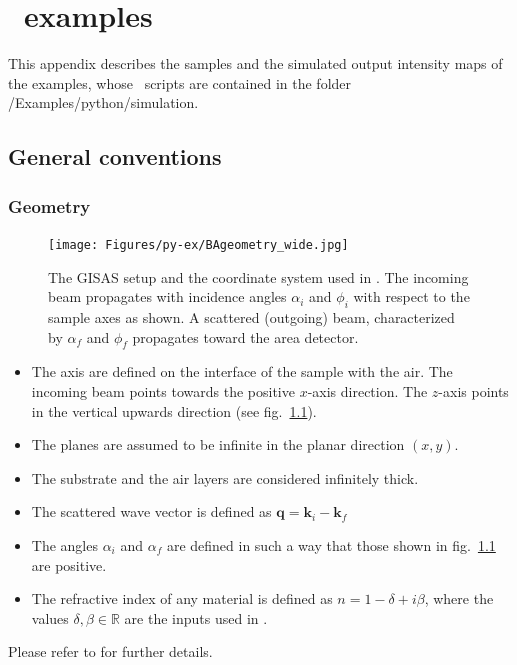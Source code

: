 

\chapter{\Python\ examples}
This appendix describes the samples and the simulated output intensity maps of the examples, whose \Python\ scripts are contained in the folder /Examples/python/simulation.

\section{General conventions}
\subsection{Geometry}

\begin{figure}[H]
\begin{center}
\texttt{[image: Figures/py-ex/BAgeometry\_wide.jpg]}
\end{center}
\caption{The GISAS setup and the coordinate system used in
\BornAgain. The incoming  beam propagates with incidence angles $\alpha_i$ and $\phi_i$ with respect to the sample axes as shown. A scattered (outgoing) beam, characterized by $\alpha_f$ and $\phi_f$ propagates toward the area detector.}
\label{fig:BAsetup_app}
\end{figure}


\begin{itemize}
\item The axis are defined on the interface of the sample with the air. 
The incoming beam points towards the positive $x$-axis direction. The $z$-axis points in the vertical upwards direction (see fig.~\ref{fig:BAsetup_app}).
\item The planes are assumed to be infinite in the planar direction $(x, y)$.
\item The substrate and the air layers are considered infinitely thick.
\item The scattered wave vector is defined as $\mathbf{q}=\mathbf{k}_i-\mathbf{k}_f$
\item The angles $\alpha_i$ and $\alpha_f$ are defined in such a way that those shown in fig.~\ref{fig:BAsetup_app}  are positive.
\item The refractive index of any material is defined as $n=1- \delta + i \beta$, where the values $\delta, \beta \in \mathbb R$ are the inputs used in \BornAgain.
\end{itemize}
Please refer to  for further details.

